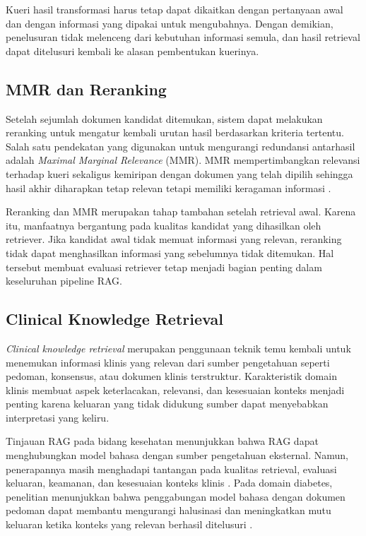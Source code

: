 Kueri hasil transformasi harus tetap dapat dikaitkan dengan pertanyaan awal dan dengan informasi yang dipakai untuk mengubahnya. Dengan demikian, penelusuran tidak
melenceng dari kebutuhan informasi semula, dan hasil retrieval dapat ditelusuri kembali ke alasan pembentukan kuerinya.

\subsection{MMR dan Reranking}
\label{subsec:bab2-mmr-reranking}

Setelah sejumlah dokumen kandidat ditemukan, sistem dapat melakukan reranking untuk mengatur kembali urutan hasil berdasarkan kriteria tertentu. Salah satu pendekatan
yang digunakan untuk mengurangi redundansi antarhasil adalah \textit{Maximal Marginal Relevance} (MMR). MMR mempertimbangkan relevansi terhadap kueri sekaligus kemiripan
dengan dokumen yang telah dipilih sehingga hasil akhir diharapkan tetap relevan tetapi memiliki keragaman informasi \parencite{carbonell1998}.

Reranking dan MMR merupakan tahap tambahan setelah retrieval awal. Karena itu, manfaatnya bergantung pada kualitas kandidat yang dihasilkan oleh retriever. Jika
kandidat awal tidak memuat informasi yang relevan, reranking tidak dapat menghasilkan informasi yang sebelumnya tidak ditemukan. Hal tersebut membuat evaluasi retriever tetap
menjadi bagian penting dalam keseluruhan pipeline RAG.

\subsection{Clinical Knowledge Retrieval}
\label{subsec:bab2-clinical-knowledge-retrieval}

\textit{Clinical knowledge retrieval} merupakan penggunaan teknik temu kembali untuk menemukan informasi klinis yang relevan dari sumber pengetahuan seperti pedoman,
konsensus, atau dokumen klinis terstruktur. Karakteristik domain klinis membuat aspek keterlacakan, relevansi, dan kesesuaian konteks menjadi penting karena keluaran yang
tidak didukung sumber dapat menyebabkan interpretasi yang keliru.

Tinjauan RAG pada bidang kesehatan menunjukkan bahwa RAG dapat menghubungkan model bahasa dengan sumber pengetahuan eksternal. Namun, penerapannya masih menghadapi
tantangan pada kualitas retrieval, evaluasi keluaran, keamanan, dan kesesuaian konteks klinis \parencite{amugongo2025}. Pada domain diabetes, penelitian
menunjukkan bahwa penggabungan model bahasa dengan dokumen pedoman dapat membantu mengurangi halusinasi dan meningkatkan mutu keluaran ketika konteks yang relevan berhasil
ditelusuri \parencite{lee2024,wang2024}.

